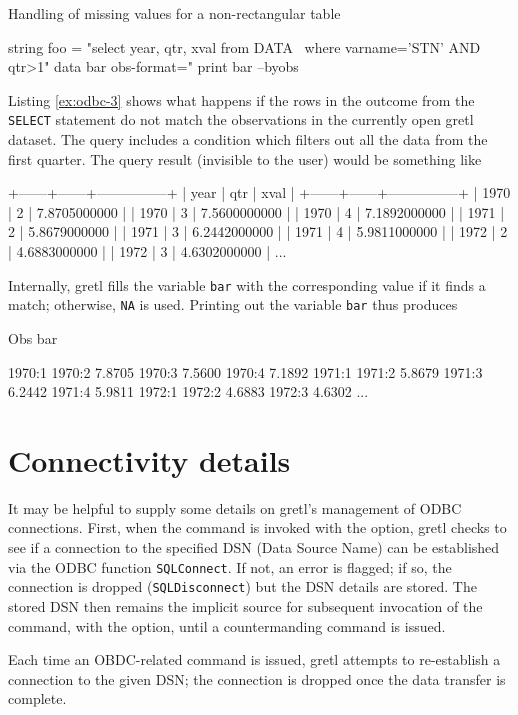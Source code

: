 \begin{script}[htbp]
  \caption{Handling of missing values for a non-rectangular table}
  \label{ex:odbc-3}
\begin{scode}
string foo = "select year, qtr, xval from DATA \
       where varname='STN' AND qtr>1"
data bar obs-format="%
print bar --byobs
\end{scode}

Listing \ref{ex:odbc-3} shows what happens if the rows in
the outcome from the \texttt{SELECT} statement do not match the
observations in the currently open gretl dataset. The query
includes a condition which filters out all the data from the first
quarter. The query result (invisible to the user) would be something
like
\begin{code}
+------+------+---------------+
| year | qtr  | xval          |
+------+------+---------------+
| 1970 |    2 |  7.8705000000 | 
| 1970 |    3 |  7.5600000000 | 
| 1970 |    4 |  7.1892000000 | 
| 1971 |    2 |  5.8679000000 | 
| 1971 |    3 |  6.2442000000 | 
| 1971 |    4 |  5.9811000000 | 
| 1972 |    2 |  4.6883000000 | 
| 1972 |    3 |  4.6302000000 | 
...
\end{code}
Internally, gretl fills the variable \texttt{bar} with the
corresponding value if it finds a match; otherwise, \texttt{NA} is
used. Printing out the variable \texttt{bar} thus produces
\begin{code}
     Obs           bar

  1970:1              
  1970:2        7.8705
  1970:3        7.5600
  1970:4        7.1892
  1971:1              
  1971:2        5.8679
  1971:3        6.2442
  1971:4        5.9811
  1972:1              
  1972:2        4.6883
  1972:3        4.6302
...
\end{code}

\end{script}

\section{Connectivity details}
\label{sec:odbc-conn}

It may be helpful to supply some details on gretl's management of ODBC
connections. First, when the \cmd{open} command is invoked with the
\option{odbc} option, gretl checks to see if a connection to the
specified DSN (Data Source Name) can be established via the ODBC
function \texttt{SQLConnect}. If not, an error is flagged; if so, the
connection is dropped (\texttt{SQLDisconnect}) but the DSN details are
stored. The stored DSN then remains the implicit source for subsequent
invocation of the \cmd{data} command, with the \option{odbc} option,
until a countermanding \cmd{open} command is issued.

Each time an OBDC-related  command is issued, gretl attempts
to re-establish a connection to the given DSN; the connection is
dropped once the data transfer is complete.

